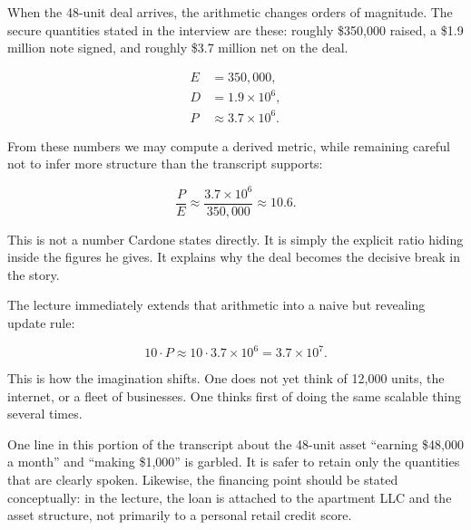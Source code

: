 When the 48-unit deal arrives, the arithmetic changes orders of magnitude. The secure quantities stated in the interview are these: roughly \$350{,}000 raised, a \$1.9 million note signed, and roughly \$3.7 million net on the deal.

\begin{align}
E &= 350{,}000,\\
D &= 1.9\times 10^6,\\
P &\approx 3.7\times 10^6.
\end{align}

From these numbers we may compute a derived metric, while remaining careful not to infer more structure than the transcript supports:

\begin{equation}
\frac{P}{E}\approx \frac{3.7\times 10^6}{350{,}000}\approx 10.6.
\end{equation}

This is not a number Cardone states directly. It is simply the explicit ratio hiding inside the figures he gives. It explains why the deal becomes the decisive break in the story.

The lecture immediately extends that arithmetic into a naive but revealing update rule:

\begin{equation}
10\cdot P \approx 10\cdot 3.7\times 10^6 = 3.7\times 10^7.
\end{equation}

This is how the imagination shifts. One does not yet think of 12,000 units, the internet, or a fleet of businesses. One thinks first of doing the same scalable thing several times.

\begin{remark}
One line in this portion of the transcript about the 48-unit asset ``earning \$48,000 a month'' and ``making \$1,000'' is garbled. It is safer to retain only the quantities that are clearly spoken. Likewise, the financing point should be stated conceptually: in the lecture, the loan is attached to the apartment LLC and the asset structure, not primarily to a personal retail credit score.
\end{remark}


